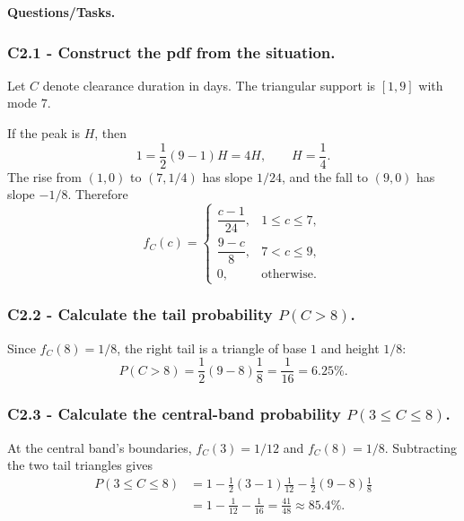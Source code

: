 \begingroup{}
\endgroup

\textbf{Questions/Tasks.}
\begin{enumerate}
\end{enumerate}

\subsubsection*{C2.1 - Construct the pdf from the situation.}
\label{subsec:c2-triangular-clearance-a}
Let $C$ denote clearance duration in days.  The triangular support is $[1,9]$
with mode $7$.

If the peak is $H$, then
\[
 1=\frac12(9-1)H=4H,\qquad H=\frac14.
\]
The rise from $(1,0)$ to $(7,1/4)$ has slope $1/24$, and the fall to $(9,0)$
has slope $-1/8$.  Therefore
\[
 f_C(c)=\begin{cases}
 \dfrac{c-1}{24},&1\le c\le7,\\[2mm]
 \dfrac{9-c}{8},&7<c\le9,\\[2mm]
 0,&\text{otherwise.}
 \end{cases}
\]

\subsubsection*{C2.2 - Calculate the tail probability $P(C>8)$.}
\label{subsec:c2-triangular-clearance-b}
Since $f_C(8)=1/8$, the right tail is a triangle of base $1$ and height
$1/8$:
\[
 P(C>8)=\frac12(9-8)\frac18=\frac1{16}=6.25\%.
\]

\subsubsection*{C2.3 - Calculate the central-band probability
$P(3\le C\le8)$.}
\label{subsec:c2-triangular-clearance-c}
At the central band's boundaries, $f_C(3)=1/12$ and $f_C(8)=1/8$.
Subtracting the two tail triangles gives
\[
 \begin{aligned}
 P(3\le C\le8)
 &=1-\frac12(3-1)\frac1{12}-\frac12(9-8)\frac18\\
 &=1-\frac1{12}-\frac1{16}=\frac{41}{48}\approx85.4\%.
 \end{aligned}
\]

